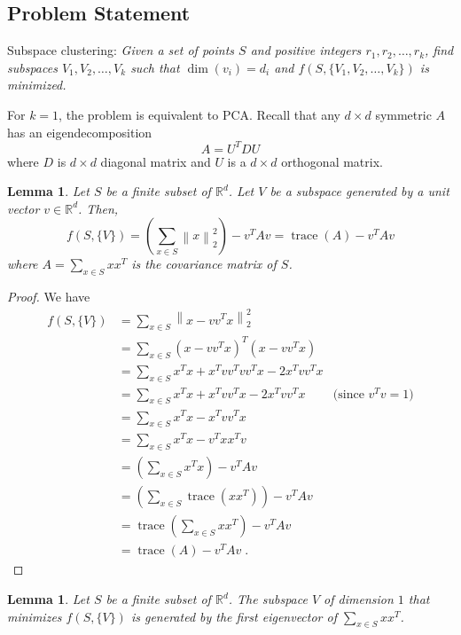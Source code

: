\documentclass{article}
\newtheorem{lemma}[theorem]{Lemma}
\newcommand{\R}{\mathbb{R}}
\newcommand{\norm}[1]{\left\|#1\right\|}
\DeclareMathOperator*{\trace}{trace}
\begin{document}
\subsection{Problem Statement}

Subspace clustering: \emph{Given a set of points $S$ and positive integers
$r_1, r_2, \dots, r_k$, find subspaces $V_1, V_2, \dots, V_k$ such that
$\dim(v_i) = d_i$ and $f(S, \{V_1, V_2, \dots, V_k\})$ is minimized.}

For $k=1$, the problem is equivalent to PCA. Recall that any $d \times d$
symmetric $A$ has an eigendecomposition
$$
A = U^T D U
$$
where $D$ is $d \times d$ diagonal matrix and $U$ is a $d \times d$
orthogonal matrix.

\begin{lemma}
Let $S$ be a finite subset of $\R^d$. Let $V$ be a subspace
generated by a unit vector $v \in \R^d$. Then,
$$
f(S,\{V\})
= \left(\sum_{x \in S} \norm{x}_2^2 \right) - v^T A v
= \trace(A) - v^T A v
$$
where $A = \sum_{x \in S} xx^T$ is the covariance matrix of $S$.
\end{lemma}

\begin{proof}
We have
\begin{align*}
f(S, \{V\})
& = \sum_{x \in S} \norm{x - vv^T x}_2^2 \\
& = \sum_{x \in S} (x - vv^T x)^T (x - vv^Tx) \\
& = \sum_{x \in S} x^Tx + x^T vv^T vv^T x - 2 x^T vv^T x  \\
& = \sum_{x \in S} x^Tx + x^T vv^T x - 2 x^T vv^T x & \text{(since $v^Tv = 1$)} \\
& = \sum_{x \in S} x^Tx - x^T vv^T x  \\
& = \sum_{x \in S} x^Tx - v^T xx^T v  \\
& = \left(\sum_{x \in S} x^Tx \right) - v^T A v  \\
& = \left(\sum_{x \in S} \trace(xx^T) \right) - v^T A v \\
& = \trace \left(\sum_{x \in S} xx^T \right) - v^T A v \\
& = \trace(A) - v^T A v \; .
\end{align*}
\end{proof}

\begin{lemma}
Let $S$ be a finite subset of $\R^d$.
The subspace $V$ of dimension $1$ that minimizes $f(S, \{V\})$ is generated
by the first eigenvector of $\sum_{x \in S} xx^T$.
\end{lemma}
\end{document}

